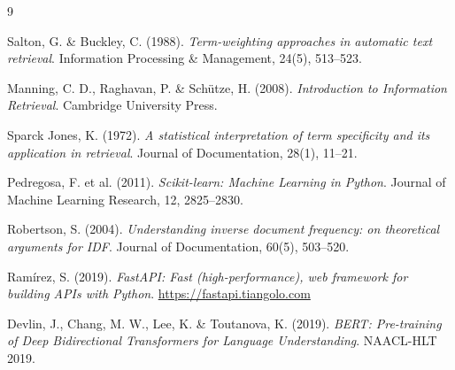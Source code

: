\documentclass[12pt, a4paper]{article}
\begin{document}
\newpage
\begin{thebibliography}{9}

Salton, G. \& Buckley, C. (1988).
\textit{Term-weighting approaches in automatic text retrieval}.
Information Processing \& Management, 24(5), 513--523.

Manning, C. D., Raghavan, P. \& Schütze, H. (2008).
\textit{Introduction to Information Retrieval}.
Cambridge University Press.

Sparck Jones, K. (1972).
\textit{A statistical interpretation of term specificity and its application in retrieval}.
Journal of Documentation, 28(1), 11--21.

Pedregosa, F. et al. (2011).
\textit{Scikit-learn: Machine Learning in Python}.
Journal of Machine Learning Research, 12, 2825--2830.

Robertson, S. (2004).
\textit{Understanding inverse document frequency: on theoretical arguments for IDF}.
Journal of Documentation, 60(5), 503--520.

Ramírez, S. (2019).
\textit{FastAPI: Fast (high-performance), web framework for building APIs with Python}.
\url{https://fastapi.tiangolo.com}

Devlin, J., Chang, M. W., Lee, K. \& Toutanova, K. (2019).
\textit{BERT: Pre-training of Deep Bidirectional Transformers for Language Understanding}.
NAACL-HLT 2019.

\end{thebibliography}
\end{document}
